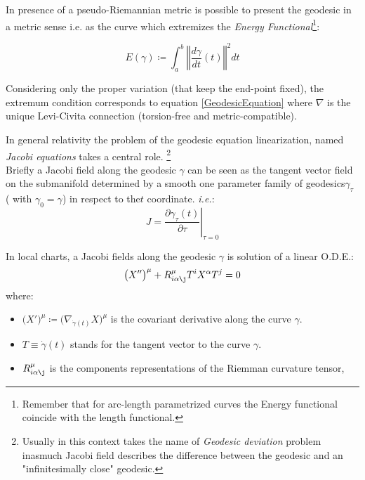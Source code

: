 \documentclass[Main]{subfiles}
\begin{document}
	\vspace{4mm}
	In presence of a pseudo-Riemannian metric is possible to present the geodesic in a metric sense i.e. as the curve  which extremizes the \emph{Energy Functional}\footnote{Remember that for arc-length parametrized curves the Energy functional coincide with the length functional.\cite[Lemma $1.4.2$ ]{Jost2005}}:
	\begin{definition}
  	\begin{equation}\label{EnergyFunctional}
 		E(\gamma) \coloneqq \int_a^b \left\Vert \frac{d \gamma}{dt} (t)\right\Vert^2 dt
 	\end{equation}
\end{definition} 	
	Considering only the proper variation (that keep the end-point fixed), the extremum condition corresponds to equation \ref{GeodesicEquation} where $\nabla$ is the unique Levi-Civita connection (torsion-free and metric-compatible).

	\vspace{4mm}
	In general relativity the problem of the geodesic equation linearization, named \emph{Jacobi equations} takes a central role. \footnote{Usually in this context takes the name of \emph{Geodesic deviation} problem\cite[pag. 46]{Wald1984} inasmuch Jacobi field describes the difference between the geodesic and an "infinitesimally close" geodesic.}
	\\
	Briefly a Jacobi field along the geodesic $\gamma$ can be seen as the tangent vector field on the submanifold determined by  a smooth one parameter family of geodesics$ \gamma_\tau$ ( with $\gamma_0=\gamma$) in respect to the$t$ coordinate. \textit{i.e.}:
	\begin{displaymath}
	 J = \left. \frac{\partial \gamma_\tau (t)}{\partial \tau}\right\rvert_{\tau=0}
	\end{displaymath}
	
		In local charts, a Jacobi fields along the geodesic $\gamma$ is solution of a linear O.D.E.:
		\begin{equation}\label{JacobiEquationComponents}
			\big( X''\big)^\mu + R^\mu_{i \alpha \j} T^i X^\alpha T^j =0
		\end{equation}
		where:
		\begin{itemize}
			\item $\big(X'\big)^\mu \coloneqq \big( \nabla_{\dot{\gamma}(t)} X\big)^\mu$ is the covariant derivative along the curve $\gamma$.
			\item $T \equiv \dot{\gamma}(t)$ stands for the tangent vector to the curve $\gamma$.
			\item $R^\mu_{i \alpha \j}$ is the components representations of the Riemman curvature tensor,
		\end{itemize}
\end{document}
